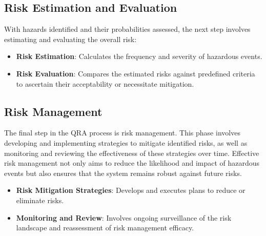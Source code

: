 \subsection*{Risk Estimation and Evaluation}
With hazards identified and their probabilities assessed, the next step involves estimating and evaluating the overall risk:

\begin{itemize}
    \item \textbf{Risk Estimation}: Calculates the frequency and severity of hazardous events.
    \item \textbf{Risk Evaluation}: Compares the estimated risks against predefined criteria to ascertain their acceptability or necessitate mitigation.
\end{itemize}

\subsection*{Risk Management}
The final step in the QRA process is risk management. This phase involves developing and implementing strategies to mitigate identified risks, as well as monitoring and reviewing the effectiveness of these strategies over time. Effective risk management not only aims to reduce the likelihood and impact of hazardous events but also ensures that the system remains robust against future risks.

\begin{itemize}
    \item \textbf{Risk Mitigation Strategies}: Develops and executes plans to reduce or eliminate risks.
    \item \textbf{Monitoring and Review}: Involves ongoing surveillance of the risk landscape and reassessment of risk management efficacy.
\end{itemize}
